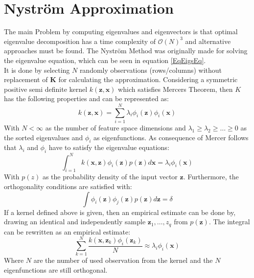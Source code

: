 \section{Nyström Approximation}\label{InSecNysMeth}
The main Problem by computing eigenvalues and eigenvectors is that optimal eigenvalue decomposition has a time complexity of $\mathcal{O}(N)^3$ and alternative approaches must be found.
The Nyström Method was originally made for solving the eigenvalue equation, which can be seen in equation \eqref{EqEigsEq}.\cite{Zhang.2008}\\
It is done by selecting $N$ randomly observations (rows/columns) without replacement of $\mathbf{K}$ for calculating the approximation.\cite{Williams.2000}
Considering a symmetric positive semi definite kernel $k(\mathbf{z},\mathbf{x})$ which satisfies Mercers Theorem, then $K$ has the following properties and can be represented as:\cite{Williams.2000}
\begin{equation}\label{EqKernelRep}
	k(\mathbf{z},\mathbf{x}) = \sum_{i=1}^{N}\lambda_i\phi_i(\mathbf{z})\phi_i(\mathbf{x}) 
\end{equation}
With $N < \infty$ as the number of feature space dimensions and $\lambda_1 \ge \lambda_2\ge\dots\ge0$ as the sorted eigenvalues and $\phi_i$ as eigenfunctions.
As consequence of Mercer follows that  $\lambda_i$ and $\phi_i$ have to satisfy the eigenvalue equations:
 \begin{equation}\label{EqEigsEq}
	\int_{i=1}^{N} k(\mathbf{x},\mathbf{z})\phi_i(\mathbf{z})p(\mathbf{z})d\mathbf{x} = \lambda_i\phi_i(\mathbf{x})
\end{equation}
With $p(z)$ as the probability density of the input vector $\mathbf{z}$.
Furthermore, the orthogonality conditions are satisfied with:\cite[p. 59]{Scholkopf.2001}
\begin{equation}\label{EqEigsOrt}
	\int \phi_i(\mathbf{z})\phi_j(\mathbf{z})p(\mathbf{z})d\mathbf{z} = \delta
\end{equation}
If a kernel defined above is given, then an empirical estimate can be done by, drawing an identical and independently sample ${\mathbf{z}_1,\dots,z_q}$ from $p(\mathbf{z})$.
The integral can be rewritten as an empirical estimate:\cite{Williams.2000}
\begin{equation}\label{EqEigsEmp}
	\sum_{k=1}^{N}\frac{k(\mathbf{x},\mathbf{z}_k)\phi_i(\mathbf{z}_k)}{N} \approx \lambda_i\phi_i(\mathbf{x})
\end{equation}
Where $N$ are the number of used observation from the kernel and the $N$ eigenfunctions are still orthogonal.
